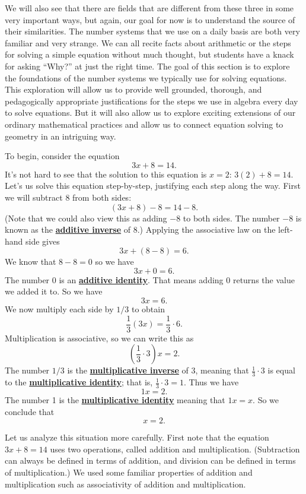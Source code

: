 \documentclass[11pt]{article}
\renewcommand\emph[1]{\underline{\bf{#1}}} %
\theoremstyle{definition}
\begin{document}
We will also see that there are fields that are different from these three in some very important ways, but again, our goal for now is to understand the source
of their similarities. The number systems that we use on a daily basis are both very familiar and very strange. We can all recite facts about arithmetic
or the steps for solving a simple equation without much thought, but students have a knack for asking ``Why?'' at just the right time. The goal of this section
is to explore the foundations of the number systems we typically use for solving equations. This exploration will allow us to provide well grounded, thorough, and
pedagogically appropriate justifications for the steps we use in algebra every day to solve equations. But it will also allow us to explore exciting extensions of
our ordinary mathematical practices and allow us to connect equation solving to geometry in an intriguing way.

To begin, consider the equation
      \[ 3x + 8 = 14. \]
It's not hard to see that the solution to this equation is $x=2$: $3(2)+8 = 14$. Let's us solve this equation step-by-step, justifying each step along the 
way. First we will subtract $8$ from both sides:
\[ (3x+8)-8 = 14 -8.\]
(Note that we could also view this as adding $-8$ to both sides. The number $-8$ is known as the \emph{additive inverse} of $8$.) Applying the associative 
law on the left-hand side gives
\[ 3x + (8-8) = 6.\]
We know that $8-8=0$ so we have
\[ 3x + 0 = 6.\]
The number 0 is an \emph{additive identity}. That means adding 0 returns the value we added it to. So we have
\[ 3x = 6.\]
We now multiply each side by $1/3$ to obtain
\[ \frac{1}{3}(3x) = \frac{1}{3}\cdot 6. \]
Multiplication is associative, so we can write this as
\[ \left( \frac{1}{3}\cdot 3 \right)x = 2. \]
The number $1/3$ is the \emph{multiplicative inverse} of $3$, meaning that $\frac{1}{3}\cdot 3$ is equal to the \emph{multiplicative identity}; that is, $\frac{1}{3}\cdot 3 = 1$. Thus we have
\[ 1x = 2.\]
The number 1 is the \emph{multiplicative identity} meaning that $1x = x$. So we conclude that
\[ x = 2.\]

Let us analyze this situation more carefully. First note that the equation $3x+8 = 14$ uses two operations, called addition and multiplication. 
(Subtraction can always be defined in terms of addition, and division can be defined in terms of multiplication.)
We used some familiar properties of addition and multiplication such as associativity of addition and multiplication.
\end{document}
